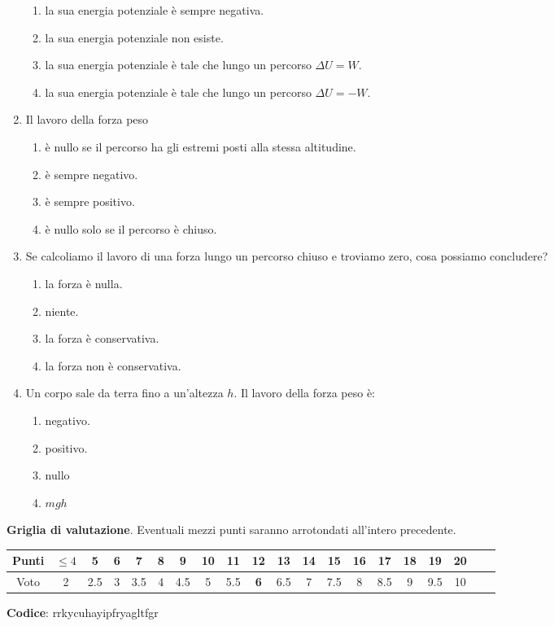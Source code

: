 \documentclass{article}
\begin{document}
\begin{enumerate}
\begin{enumerate}[label=\Alph*.]
    \item la sua energia potenziale è sempre negativa.
    \item la sua energia potenziale non esiste.
    \item la sua energia potenziale è tale che lungo un percorso $\Delta U=W$.
    \item la sua energia potenziale è tale che lungo un percorso $\Delta U=-W$.
  \end{enumerate}
  \item Il lavoro della forza peso
  \begin{enumerate}[label=\Alph*.]
    \item è nullo se il percorso ha gli estremi posti alla stessa altitudine.
    \item è sempre negativo.
    \item è sempre positivo.
    \item è nullo solo se il percorso è chiuso.
  \end{enumerate}
  \item Se calcoliamo il lavoro di una forza lungo un percorso chiuso e troviamo zero, cosa possiamo concludere?
  \begin{enumerate}[label=\Alph*.]
    \item la forza è nulla.
    \item niente.
    \item la forza è conservativa.
    \item la forza non è conservativa.
  \end{enumerate}
  \item Un corpo sale da terra fino a un'altezza $h$. Il lavoro della forza peso è:
  \begin{enumerate}[label=\Alph*.]
    \item negativo.
    \item positivo.
    \item nullo
    \item $mgh$
  \end{enumerate}
\end{enumerate}








\newpage \maketitle \centering \textbf{Griglia di valutazione}. Eventuali mezzi punti saranno arrotondati all'intero precedente. \begin{table}[h]     \centering \begin{tabular}{|c|c|c|c|c|c|c|c|c|c|c|c|c|c|c|c|c|c|c|c|} \hline Punti &  $\leq 4$ & 5 & 6 & 7 & 8 & 9 & 10 & 11 & \textbf{12} & 13 & 14 & 15 & 16 & 17 & 18 & 19 & 20 \\ \hline Voto & 2 & 2.5 & 3 & 3.5 & 4 & 4.5 & 5 & 5.5 & \textbf{6} & 6.5 & 7 & 7.5 & 8 & 8.5 & 9 & 9.5 & 10 \\ \hline \end{tabular} \end{table}
\textbf{Codice}: rrkycuhayipfryagltfgr
\end{document}
